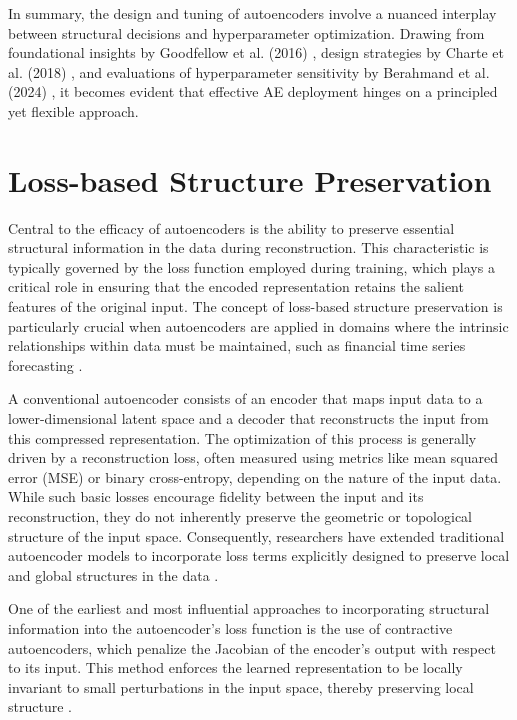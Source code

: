 In summary, the design and tuning of autoencoders involve a nuanced interplay between structural decisions and hyperparameter optimization. Drawing from foundational insights by Goodfellow et al. (2016) \cite{Goodfellow16}, design strategies by Charte et al. (2018) \cite{Charte18}, and evaluations of hyperparameter sensitivity by Berahmand et al. (2024) \cite{Berahmand24}, it becomes evident that effective AE deployment hinges on a principled yet flexible approach.

\section{Loss-based Structure Preservation}

Central to the efficacy of autoencoders is the ability to preserve essential structural information in the data during reconstruction. This characteristic is typically governed by the loss function employed during training, which plays a critical role in ensuring that the encoded representation retains the salient features of the original input. The concept of loss-based structure preservation is particularly crucial when autoencoders are applied in domains where the intrinsic relationships within data must be maintained, such as financial time series forecasting \cite{Bieganowski24}.

A conventional autoencoder consists of an encoder that maps input data to a lower-dimensional latent space and a decoder that reconstructs the input from this compressed representation. The optimization of this process is generally driven by a reconstruction loss, often measured using metrics like mean squared error (MSE) or binary cross-entropy, depending on the nature of the input data. While such basic losses encourage fidelity between the input and its reconstruction, they do not inherently preserve the geometric or topological structure of the input space. Consequently, researchers have extended traditional autoencoder models to incorporate loss terms explicitly designed to preserve local and global structures in the data \cite{Goodfellow16}.

One of the earliest and most influential approaches to incorporating structural information into the autoencoder's loss function is the use of contractive autoencoders, which penalize the Jacobian of the encoder’s output with respect to its input. This method enforces the learned representation to be locally invariant to small perturbations in the input space, thereby preserving local structure \cite{Rifai11}.

